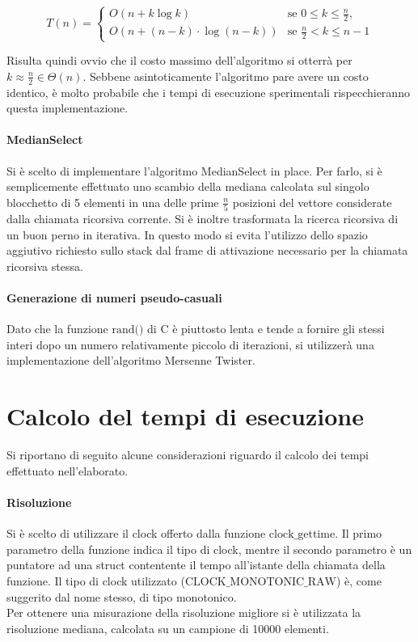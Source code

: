 \documentclass{article}
\begin{document}
	
	\[
		T\left(n\right) =
			\begin{cases}
				O\left(n + k\log{k}\right)  & \text{se $0\leq k \leq \frac{n}{2}$,} \\
				O\left(n + \left(n-k\right)\cdot\log{\left(n-k\right)}\right) & \text{se $\frac{n}{2} < k \leq n-1$} 
			\end{cases}
	\]
	
	Risulta quindi ovvio che il costo massimo dell'algoritmo si otterrà per $k\approx \frac{n}{2} \in \Theta\left(n\right)$. Sebbene asintoticamente l'algoritmo pare avere un costo identico, è molto probabile che i tempi di esecuzione sperimentali rispecchieranno questa implementazione.
	
	\paragraph{MedianSelect} 
	Si è scelto di implementare l'algoritmo MedianSelect in place. Per farlo, si è semplicemente effettuato uno scambio della mediana calcolata sul singolo blocchetto di 5 elementi in una delle prime $\frac{n}{5}$ posizioni del vettore considerate dalla chiamata ricorsiva corrente. Si è inoltre trasformata la ricerca ricorsiva di un buon perno in iterativa. In questo modo si evita l'utilizzo dello spazio aggiutivo richiesto sullo stack dal frame di attivazione necessario per la chiamata ricorsiva stessa.
	
	\paragraph{Generazione di numeri pseudo-casuali}
	Dato che la funzione $\text{rand()}$ di C è piuttosto lenta e tende a fornire gli stessi interi dopo un numero relativamente piccolo di iterazioni, si utilizzerà una implementazione dell'algoritmo Mersenne Twister.
	
	\newpage
	\section{Calcolo del tempi di esecuzione}	
	Si riportano di seguito alcune	considerazioni riguardo il calcolo dei tempi effettuato nell'elaborato.
	
	\paragraph{Risoluzione}
	Si è scelto di utilizzare il clock offerto dalla funzione $\text{clock\_gettime}$. Il primo parametro della funzione indica il tipo di clock, mentre il secondo parametro è un puntatore ad una struct contentente il tempo all'istante della chiamata della funzione. Il tipo di clock utilizzato ($\text{CLOCK\_MONOTONIC\_RAW}$) è, come suggerito dal nome stesso, di tipo monotonico. \\ Per ottenere una misurazione della risoluzione migliore si è utilizzata la risoluzione mediana, calcolata su un campione di 10000 elementi.
	
\end{document}
